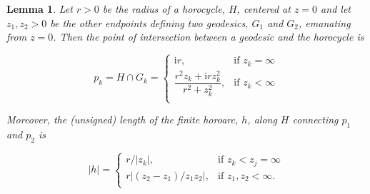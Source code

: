 \documentclass[10pt,a4paper]{article}
\newtheorem{lemma}{Lemma}
\newcommand{\len}[1]{\left\lvert #1 \right\rvert}
\renewcommand{\i}{\mathrm{i}}
\begin{document}
\begin{lemma}
\label{lem:horoarcs}
Let $r > 0$ be the radius of a horocycle, $H$, centered at $z=0$ and let $z_1, z_2 > 0$ be the other endpoints defining two geodesics, $G_1$ and $G_2$, emanating from $z=0$. Then the point of intersection between a geodesic and the horocycle is 

\[
    p_k = H \cap G_k = 
        \begin{cases}
            \i r, & \text{if } z_k = \infty \\
            \dfrac{r^2 z_k + \i r z_k^2}{r^2+z_k^2}, & \text{if } z_k < \infty \\
        \end{cases}
\]

\noindent Moreover, the (unsigned) length of the finite horoarc, $h$, along $H$ connecting $p_1$ and $p_2$ is 

\[
\len{h} = 
    \begin{cases} 
       r/\lvert z_k \rvert, & \text{if } z_k < z_j = \infty \\
        r\lvert (z_2 - z_1)/z_1 z_2\rvert , & \text{if } z_1, z_2 < \infty. \\
    \end{cases}
\]

\end{lemma}
\end{document}
